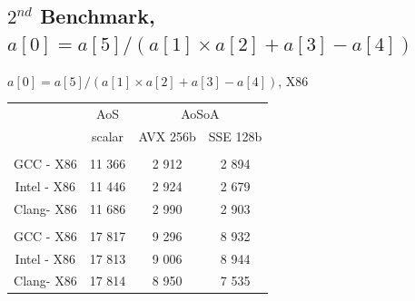 \documentclass{beamer}
\begin{document}
\subsection*{$2^{nd}$ Benchmark, $a[0] = a[5]/(a[1] \times a[2]+a[3]-a[4])$}
\begin{frame}[fragile]
\centering
$a[0] = a[5]/(a[1] \times a[2]+a[3]-a[4])$, X86
\vspace{0.5cm}

\begin{tabular}{ c  c | c c }
           & AoS& \multicolumn{2}{c}{AoSoA}\\
                        & scalar& AVX 256b & SSE 128b\\
                        \hline
\color{C0}{float} & & & \\
   GCC - X86  & 11 366  & 2 912 & \cellcolor{C2}2 894 \\
   Intel  - X86   & 11 446 & 2 924 &\cellcolor{C2} 2 679\\
   Clang- X86  & 11 686  & 2 990 & \cellcolor{C2}2 903 \\
      \hline
        \color{C0}{double}                     &  & & \\
   GCC - X86  & 17 817   & 9 296 & \cellcolor{C2}8 932 \\
   Intel  - X86   & 17 813  & 9 006 & \cellcolor{C2}8 944\\
   Clang- X86  & 17 814  & 8 950 & \cellcolor{C2}7 535 \\
   \hline

\end{tabular}

\end{frame}

\end{document}
